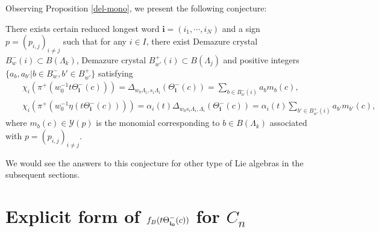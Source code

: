Observing Proposition \ref{del-mono}, we present the following
conjecture:
\begin{conj}[\cite{N4}]
\label{conj1}
There exists certain reduced longest word 
${{\mathbf i}}=(i_1,{\cdots}, i_N)$ and a  sign $p=(p_{i,j})_{i\ne j}$ 
such that for any $i\in I$, 
there exist Demazure crystal $B^-_{w}(i)\subset B({\Lambda}_k)$,
Demazure crystal $B^+_{w'}(i)\subset B({\Lambda}_j)$ and 
positive integers $\{a_b,a_{b'}|b\in B^-_w,b'\in B^+_{w'}\}$ satisfying
\begin{eqnarray*}
&&\chi_i(\pi^+(w_0^{-1}t\Theta_{{\mathbf i}}^-(c)))=
{\Delta}_{w_0{\Lambda}_i,s_i{\Lambda}_i}(\Theta_{{\mathbf i}}^-(c))=
\sum_{b\in B^-_w(i)}a_b
m_b(c),\\
&&\chi_i(\pi^+(w_0^{-1}\eta(t\Theta_{{\mathbf i}}^-(c))))=
{\alpha}_i(t){\Delta}_{w_0s_i{\Lambda}_i,{\Lambda}_i}(\Theta_{{\mathbf i}}^-(c))=
{\alpha}_i(t)\sum_{b'\in B^+_{w'}(i)}a_{b'}m_{b'}(c),
\end{eqnarray*}
where $m_b(c)\in{{\mathcal Y}}(p)$ is the monomial corresponding to $b\in B({\Lambda}_k)$
associated with $p=(p_{i,j})_{i\ne j}$.
\end{conj}

We would see the answers to this
conjecture for other type of Lie algebras in the 
subsequent sections.

\section{Explicit form of 
$f_B(t\Theta_{\bfii0}^-(c))$ for $C_n$}\label{cn}
\setcounter{equation}{0}


